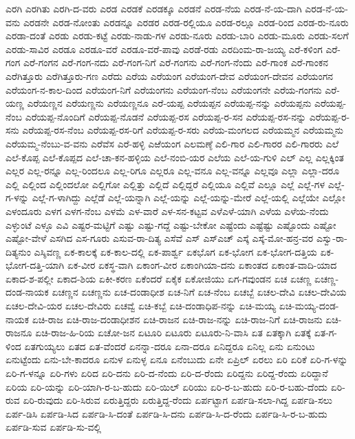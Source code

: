 ಎರಗಿ
ಎರಗಿತು
ಎರಗಿ-ದ-ವರು
ಎರಡ
ಎರಡಕೆ
ಎರಡಕ್ಕೂ
ಎರಡನೆ
ಎರಡ-ನೆಯ
ಎರಡ-ನೆ-ಯ-ದಾಗಿ
ಎರಡ-ನೆ-ಯ-ವನು
ಎರಡನೇ
ಎರಡ-ನೋಂತು
ಎರಡನ್ನೂ
ಎರಡರ
ಎರಡ-ರಲ್ಲಿಯೂ
ಎರಡ-ರಲ್ಲೂ
ಎರಡ-ರಿಂದ
ಎರಡ-ರು-ನೂರು
ಎರಡಾ-ದಂತೆ
ಎರಡು
ಎರಡು-ಕಟ್ಟೆ
ಎರಡು-ನಾಡು-ಗಳ
ಎರಡು-ನೂರು
ಎರಡು-ಬಾರಿ
ಎರಡು-ಮೂರು
ಎರಡು-ಸಲಗೆ
ಎರಡು-ಸಾವಿರ
ಎರಡೂ
ಎರಡೂ-ವರೆ
ಎರಡೂ-ವರೆ-ಪಾವು
ಎರಡೆ-ರಡು
ಎರದಿಂಮ-ರಾ-ಜಯ್ಯ
ಎರೆ-ಕಳಿಂಗ
ಎರೆ-ಗಂಗ
ಎರೆ-ಗಂಗನ
ಎರೆ-ಗಂಗ-ನದು
ಎರೆ-ಗಂಗ-ನಿಗೆ
ಎರೆ-ಗಂಗನು
ಎರೆ-ಗಂಗ-ನೆಂದು
ಎರೆ-ಗಾಂಕ
ಎರೆ-ಗಾಂಕನ
ಎರೆಗಿತ್ತೂರು
ಎರೆಗಿತ್ತೂರು-ಗಣ
ಎರೆದು
ಎರೆಯ
ಎರೆಯಂಗ
ಎರೆಯಂಗ-ದೇವ
ಎರೆಯಂಗ-ದೇವನ
ಎರೆಯಂಗನ
ಎರೆಯಂಗ-ನ-ಕಾಲ-ದಿಂದ
ಎರೆಯಂಗ-ನಿಗೆ
ಎರೆಯಂಗನು
ಎರೆಯಂಗ-ನೆಂಬ
ಎರೆಯಂಗನೇ
ಎರೆಯ-ಗಂಗನು
ಎರೆ-ಯಣ್ಣ
ಎರೆಯಣ್ಣನ
ಎರೆಯಣ್ಣನು
ಎರೆಯಣ್ಣನೂ
ಎರೆ-ಯಪ್ಪ
ಎರೆಯಪ್ಪನ
ಎರೆಯಪ್ಪ-ನನ್ನು
ಎರೆಯಪ್ಪನು
ಎರೆಯಪ್ಪ-ನೆಂಬ
ಎರೆಯಪ್ಪ-ನೊಂದಿಗೆ
ಎರೆಯಪ್ಪ-ನೊಡನೆ
ಎರೆಯಪ್ಪ-ರಸ
ಎರೆಯಪ್ಪ-ರ-ಸನ
ಎರೆಯಪ್ಪ-ರಸ-ನನ್ನು
ಎರೆಯಪ್ಪ-ರ-ಸನು
ಎರೆಯಪ್ಪ-ರಸ-ನೆಂಬ
ಎರೆಯಪ್ಪ-ರಸ-ರಿಗೆ
ಎರೆಯಪ್ಪ-ರ-ಸರು
ಎರೆಯ-ಮಂಗಲದ
ಎರೆಯಮ್ಮನ
ಎರೆಯಮ್ಮನು
ಎರೆಯಮ್ಮ-ನೆಂಬು-ವ-ವನು
ಎರೆವೆಸ
ಎರೆ-ಹಳ್ಳಿ
ಎಱೆಯಂಗ
ಎಲಮಣ್ಠೆ
ಎಲಿ-ಗಾರ
ಎಲಿ-ಗಾರರ
ಎಲಿ-ಗಾರರು
ಎಲೆ
ಎಲೆ-ಕೊಪ್ಪ
ಎಲೆ-ಕೊಪ್ಪದ
ಎಲೆ-ಚಾ-ಕನ-ಹಳ್ಳಿಯ
ಎಲೆ-ನಂಬಿ-ಯರ
ಎಲೆಯ
ಎಲೆ-ಯ-ಗುಳಿ
ಎಲ್
ಎಲ್ಲ
ಎಲ್ಲಕ್ಕಿಂತ
ಎಲ್ಲರ
ಎಲ್ಲ-ರನ್ನೂ
ಎಲ್ಲ-ರಿಂದಲೂ
ಎಲ್ಲ-ರಿಗೂ
ಎಲ್ಲರೂ
ಎಲ್ಲ-ವನೂ
ಎಲ್ಲ-ವನ್ನೂ
ಎಲ್ಲವೂ
ಎಲ್ಲಾ
ಎಲ್ಲಾ-ದರೂ
ಎಲ್ಲಿ
ಎಲ್ಲಿಂದ
ಎಲ್ಲಿಂದಲೋ
ಎಲ್ಲಿಗೋ
ಎಲ್ಲಿತ್ತು
ಎಲ್ಲಿದೆ
ಎಲ್ಲಿದ್ದರೆ
ಎಲ್ಲಿಯೂ
ಎಲ್ಲಿವೆ
ಎಲ್ಲೂ
ಎಲ್ಲೆ
ಎಲ್ಲೆ-ಗಳ
ಎಲ್ಲೆ-ಗ-ಳನ್ನು
ಎಲ್ಲೆ-ಗ-ಳಾಗಿದ್ದು
ಎಲ್ಲೆಡೆ
ಎಲ್ಲೆ-ಯನ್ನಾಗಿ
ಎಲ್ಲೆ-ಯನ್ನು
ಎಲ್ಲೆ-ಯನ್ನು-ಮೇರೆ
ಎಲ್ಲೆ-ಯಲ್ಲಿ
ಎಲ್ಲೆಯೇ
ಎಲ್ಲೋ
ಎಳಂದೂರು
ಎಳಗ
ಎಳಗ-ನೆಂಬ
ಎಳಮೆ
ಎಳ-ವಾರೆ
ಎಳ-ಸನ-ಕಟ್ಟವ
ಎಳೆಎಳೆ-ಯಾಗಿ
ಎಳೆಯ
ಎಳೆಯ-ನೆಂದು
ಎಳ್ಳುಂಟೆ
ಎಳ್ಳೂ
ಎವಿ
ಎಷ್ಟರ-ಮಟ್ಟಿಗೆ
ಎಷ್ಟು
ಎಷ್ಟು-ಗದ್ದೆ
ಎಷ್ಟು-ಬೇಕೋ
ಎಷ್ಟೆಂದು
ಎಷ್ಟೆಷ್ಟು
ಎಷ್ಟೊಂದು
ಎಷ್ಟೋ
ಎಷ್ಟೋ-ವೇಳೆ
ಎಸಗಿದ
ಎಸ-ಗೂರು
ಎಸುವ-ರಾ-ದಿತ್ಯ
ಎಸೆವೆ
ಎಸ್
ಎಸ್ಎಚ್
ಎಸ್ಕೆ
ಎಸ್ಕೆ-ಮೋ-ಹನ್ರ-ವರ
ಎಸ್ವು-ರಾ-ದಿತ್ಯನುಂ
ಎಸ್ಶಿವಣ್ಣ
ಏಕ-ಕಾಲಕ್ಕೆ
ಏಕ-ಕಾಲ-ದಲ್ಲಿ
ಏಕ-ಪಾರ್ಶ್ವ
ಏಕಭೊಗ
ಏಕ-ಭೋಗ
ಏಕ-ಭೋಗ-ದತ್ತಿಯ
ಏಕ-ಭೋಗ-ದತ್ತಿ-ಯಾಗಿ
ಏಕ-ವೀರ
ಏಕಸ್ಥ-ವಾಗಿ
ಏಕಾಂಗ-ವೀರ
ಏಕಾಂಗಿಯಾ-ದನು
ಏಕಾಂತದ
ಏಕಾಂತ-ವಾದಿ-ಯಾದ
ಏಕಾದ-ಶ-ಪಲ್ಲೀ
ಏಕಾದ-ಶಿಯ
ಏಕೀ-ಕರಣ
ಏಕೆಂದರೆ
ಏಕೈಕ
ಏಕೋಜಿಯು
ಏಗ-ಗವುಂಡನ
ಏಚ
ಏಚಣ್ಣ
ಏಚಣ್ಣ-ದಂಡ-ನಾಯಕ
ಏಚಣ್ಣನ
ಏಚಣ್ಣನು
ಏಚ-ದಂಡಾಧೀಶ
ಏಚ-ನಿಗೆ
ಏಚ-ನೆಂಬ
ಏಚಬ್ಬೆ
ಏಚಲ-ದೇವಿ
ಏಚಲ-ದೇವಿಯ
ಏಚಲ-ದೇವಿ-ಯರ
ಏಚಲ-ದೇವಿರು
ಏಚವ್ವೆ
ಏಚಿ-ಕಬ್ಬೆ
ಏಚಿ-ದಂಡಾಧಿಪ-ನನ್ನು
ಏಚಿ-ಮಯ್ಯ
ಏಚಿ-ಮಯ್ಯ-ದಂಡ-ನಾಯಕ
ಏಚಿ-ರಾಜ
ಏಚಿ-ರಾಜ-ದಂಡಾಧೀಶನ
ಏಚಿ-ರಾಜನ
ಏಚಿ-ರಾಜ-ನನ್ನು
ಏಚಿ-ರಾಜ-ನಿಗೆ
ಏಚಿ-ರಾಜನು
ಏಚಿ-ರಾಜನೂ
ಏಚಿ-ರಾಜ-ಹಿ-ರಿಯ
ಏಚೋ-ಜನ
ಏಟೂರಿ
ಏಟೂರು
ಏಟೂರು-ನಿ-ವಾಸಿ
ಏತ
ಏತಕ್ಕಾಗಿ
ಏತಕ್ಕೆ
ಏತ-ಗ-ಳಿಂದ
ಏತಗುಯ್ಯಲು
ಏತದ
ಏತ-ವೆಂದರೆ
ಏನನ್ನಾ-ದರೂ
ಏನಾ-ದರೂ
ಏನಿದ್ದರೂ
ಏನಿಲ್ಲ
ಏನು
ಏನುಂಟು
ಏನುಟ್ಟೆಂದು
ಏನು-ಬೇ-ಕಾದರೂ
ಏನುಳ
ಏನುಳ್ಳ
ಏನೂ
ಏನೆಂಬುದು
ಏನೇ
ಏಪ್ರಿಲ್
ಏರಲು
ಏರಿ
ಏರಿಕೆ
ಏರಿ-ಗ-ಳನ್ನು
ಏರಿ-ಗ-ಳನ್ನೂ
ಏರಿ-ಗಳು
ಏರಿದ
ಏರಿ-ದನು
ಏರಿ-ದ-ನೆಂದು
ಏರಿ-ದ-ರೆಂದು
ಏರಿದ್ದನು
ಏರಿದ್ದ-ರೆಂದು
ಏರಿದ್ದಾನೆ
ಏರಿಯ
ಏರಿ-ಯನ್ನು
ಏರಿ-ಯಾಗಿ-ರ-ಬ-ಹುದು
ಏರಿ-ಯಿಲ್
ಏರಿಯು
ಏರಿ-ರ-ಬ-ಹುದು
ಏರಿ-ರ-ಬಹು-ದೆಂದು
ಏರಿ-ರುವ
ಏರಿ-ರುವುದು
ಏರಿ-ಸಿರುವ
ಏರುತ್ತಿದ್ದರು
ಏರುತ್ತಿದ್ದ-ರೆಂದು
ಏರ್ಪಟ್ಟಾಗ
ಏರ್ಪಡಿ-ಸಲಾ-ಗಿದ್ದ
ಏರ್ಪಡಿ-ಸಲು
ಏರ್ಪ-ಡಿಸಿ
ಏರ್ಪಡಿ-ಸಿದ
ಏರ್ಪಡಿ-ಸಿ-ದಂತೆ
ಏರ್ಪಡಿ-ಸಿ-ದನು
ಏರ್ಪಡಿ-ಸಿ-ದ-ರೆಂದು
ಏರ್ಪಡಿ-ಸಿ-ರ-ಬ-ಹುದು
ಏರ್ಪಡಿ-ಸುವ
ಏರ್ಪಡಿ-ಸು-ವಲ್ಲಿ
